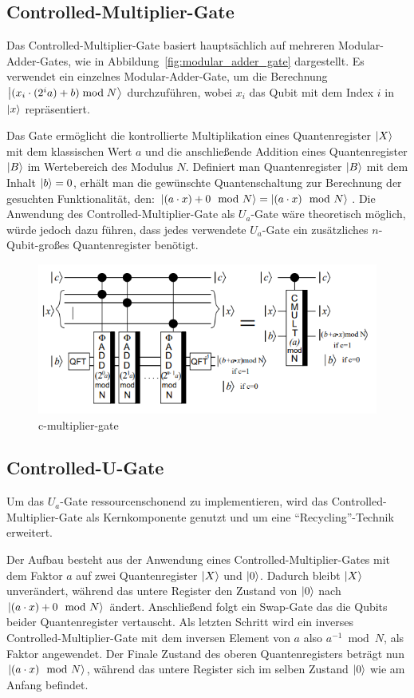 \documentclass[lettersize,journal]{IEEEtran}
\begin{document}
\subsection{Controlled-Multiplier-Gate}
Das Controlled-Multiplier-Gate basiert hauptsächlich auf mehreren Modular-Adder-Gates,
wie in Abbildung~\ref{fig:modular_adder_gate} dargestellt.
Es verwendet ein einzelnes Modular-Adder-Gate,
um die Berechnung \(\ket{(x_i\cdot(2^ia)+b) \bmod N}\) durchzuführen,
wobei \(x_i\) das Qubit mit dem Index \(i\) in \(\ket{x}\) repräsentiert.

Das Gate ermöglicht die kontrollierte Multiplikation
eines Quantenregister \(\ket{X}\) mit dem klassischen Wert \(a\) und
die anschließende Addition eines Quantenregister \(\ket{B}\) im Wertebereich des Modulus \(N\).
Definiert man Quantenregister \(\ket{B}\) mit dem Inhalt \(\ket{b} = 0\),
erhält man die gewünschte Quantenschaltung zur Berechnung der gesuchten Funktionalität, den:
\(\ket{(a \cdot x) + 0\mod N} = \ket{(a \cdot x)\mod N}\).
Die Anwendung des Controlled-Multiplier-Gate als \(U_a\)-Gate wäre theoretisch möglich,
würde jedoch dazu führen, dass jedes verwendete \(U_a\)-Gate ein
zusätzliches \(n\)-Qubit-großes Quantenregister benötigt.
\begin{figure}[!h]
\caption{c-multiplier-gate~\cite{beauregard2003circuit}}
\label{fig:c-multiplier-gate}
\includegraphics[width=\linewidth]{c-multiplier-gate.PNG}
\centering
\end{figure}

\subsection{Controlled-U-Gate}
Um das \(U_a\)-Gate ressourcenschonend zu implementieren,
wird das Controlled-Multiplier-Gate als Kernkomponente genutzt und um eine "`Recycling"'-Technik erweitert.

Der Aufbau besteht aus der Anwendung eines Controlled-Multiplier-Gates
mit dem Faktor \(a\) auf zwei Quantenregister \(\ket{X}\) und \(\ket{0}\).
Dadurch bleibt \(\ket{X}\) unverändert,
während das untere Register den Zustand von \(\ket{0}\) nach \(\ket{(a \cdot x) + 0\mod N}\) ändert.
Anschließend folgt ein Swap-Gate das die Qubits beider Quantenregister vertauscht.
Als letzten Schritt wird ein inverses Controlled-Multiplier-Gate
mit dem inversen Element von \(a\) also \(a^{-1} \bmod N\),
als Faktor angewendet.
Der Finale Zustand des oberen Quantenregisters beträgt nun \(\ket{(a \cdot x) \mod N}\),
während das untere Register sich im selben Zustand \(\ket{0}\) wie am Anfang befindet.
\end{document}
